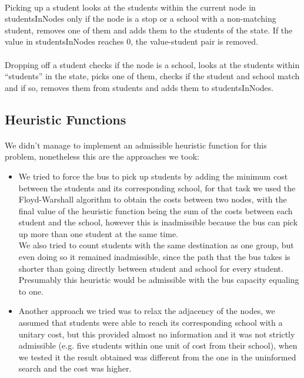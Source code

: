 \paragraph{}
Picking up a student looks at the students within the current node in studentsInNodes only if the node is a stop or a school with a non-matching student, removes one of them and adds them to the students of the state. If the value in studentsInNodes reaches 0, the value-student pair is removed.

\paragraph{}
Dropping off a student checks if the node is a school, looks at the students within “students” in the state, picks one of them, checks if the student and school match and if so, removes them from students and adds them to studentsInNodes.

\subsection{Heuristic Functions}
\paragraph{}
We didn't manage to implement an admissible heuristic function for this problem, nonetheless this are the approaches we took:

\begin{itemize}
    \item We tried to force the bus to pick up students by adding the minimum cost between the students and its corresponding school, for that task we used the Floyd-Warshall algorithm to obtain the costs between two nodes, with the final value of the heuristic function being the sum of the costs between each student and the school, however this is inadmissible because the bus can pick up more than one student at the same time.\\
    We also tried to count students with the same destination as one group, but even doing so it remained inadmissible, since the path that the bus takes is shorter than going directly between student and school for every student. Presumably this heuristic would be admissible with the bus capacity equaling to one.
    \item Another approach we tried was to relax the adjacency of the nodes, we assumed that students were able to reach its corresponding school with a unitary cost, but this provided almost no information and it was not strictly admissible (e.g. five students within one unit of cost from their school), when we tested it the result obtained was different from the one in the uninformed search and the cost was higher.
\end{itemize}

